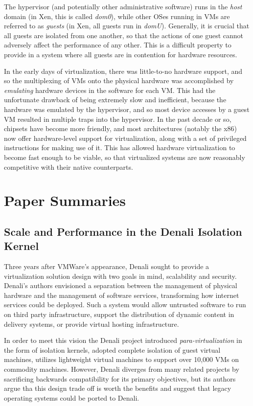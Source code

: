 \documentclass[letterpaper, twocolumn]{article}
\begin{document}
The hypervisor (and potentially other administrative software) runs in the \emph{host}
domain (in Xen, this is called \emph{dom0}), while other OSes running in VMs are 
referred to as \emph{guests} (in Xen, all guests run in \emph{domU}).  Generally, it is
crucial that all guests are isolated from one another, so that the actions of one guest
cannot adversely affect the performance of any other.  This is a difficult property
to provide in a system where all guests are in contention for hardware resources.

In the early days of virtualization, there was little-to-no hardware support,
and so the multiplexing of VMs onto the physical hardware was accomplished by
\emph{emulating} hardware devices in the software for each VM.  This had the unfortunate
drawback of being extremely slow and inefficient, because the hardware was emulated by
the hypervisor, and so most device accesses by a guest VM resulted in multiple traps
into the hypervisor.  In the past decade or so, chipsets have become more friendly,
and most architectures (notably the x86) now offer hardware-level support for
virtualization, along with a set of privileged instructions for making use of it.
This has allowed hardware virtualization to become fast enough to be viable,
so that virtualized systems are now reasonably competitive with their native
counterparts.

\section{Paper Summaries}
\label{sec:summaries}

\subsection{Scale and Performance in the Denali Isolation Kernel}
\label{sec:summaries/denali}

Three years after VMWare's appearance, Denali \cite{ref:denali} sought to provide a virtualization
solution design with two goals in mind, scalability and security. Denali's authors
envisioned a separation between the management of physical hardware and the management
of software services, transforming how internet services could be deployed. Such a system 
would allow untrusted software to run on third party infrastructure, support the distribution 
of dynamic content in delivery systems, or provide virtual hosting infrastructure.

In order to meet this vision the Denali project introduced \emph{para-virtualization} in the form 
of isolation kernels, adopted complete isolation of guest virtual machines, utilizes lightweight
virtual machines to support over 10,000 VMs on commodity machines. However, Denali diverges from many 
related projects by sacrificing backwards compatibility for its primary objectives, but its authors argue
tha this design trade off is worth the benefits and suggest that legacy operating systems could be
ported to Denali.
\end{document}
